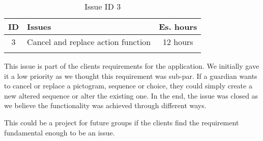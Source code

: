 \begin{longtable} { | c | p{12cm} | c | } 
\hline
	ID 	&	Issues	&		 Es. hours \\\hline
	3 	&	Cancel and replace action function	&	12 hours \\\hline
\caption{Issue ID 3}
\label{tab:spr3_cancelreplaceaction}
\end{longtable}

This issue is part of the clients requirements for the application. We initially gave it a low priority as we thought this requirement was sub-par. If a guardian wants to cancel or replace a pictogram, sequence or choice, they could simply create a new altered sequence or alter the existing one. In the end, the issue was closed as we believe the functionality was achieved through different ways.

This could be a project for future groups if the clients find the requirement fundamental enough to be an issue.